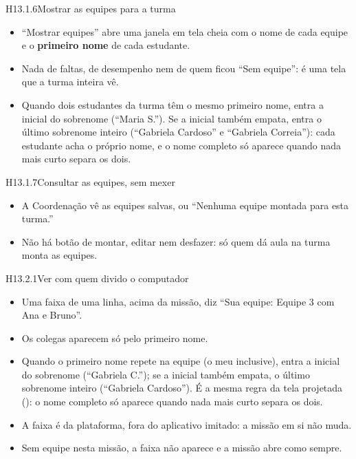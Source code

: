 \begin{historia}{H13.1.6}{Mostrar as equipes para a turma}{\pronto}
\aceite
\begin{itemize}
  \item \enquote{Mostrar equipes} abre uma janela em tela cheia com o nome de
    cada equipe e o \textbf{primeiro nome} de cada estudante.
  \item Nada de faltas, de desempenho nem de quem ficou \enquote{Sem equipe}:
    é uma tela que a turma inteira vê.
  \item Quando dois estudantes da turma têm o mesmo primeiro nome, entra a
    inicial do sobrenome (\enquote{Maria S.}). Se a inicial também empata,
    entra o último sobrenome inteiro (\enquote{Gabriela Cardoso} e
    \enquote{Gabriela Correia}): cada estudante acha o próprio nome, e o nome
    completo só aparece quando nada mais curto separa os dois.
\end{itemize}
\end{historia}

\begin{historia}{H13.1.7}{Consultar as equipes, sem mexer}{\pronto}
\aceite
\begin{itemize}
  \item A Coordenação vê as equipes salvas, ou \enquote{Nenhuma equipe montada
    para esta turma.}
  \item Não há botão de montar, editar nem desfazer: só quem dá aula na turma
    monta as equipes.
\end{itemize}
\end{historia}


\begin{historia}{H13.2.1}{Ver com quem divido o computador}{\pronto}
\aceite
\begin{itemize}
  \item Uma faixa de uma linha, acima da missão, diz \enquote{Sua equipe:
    Equipe 3 \textperiodcentered{} com Ana e Bruno}.
  \item Os colegas aparecem só pelo primeiro nome.
  \item Quando o primeiro nome repete na equipe (o meu inclusive), entra a
    inicial do sobrenome (\enquote{Gabriela C.}); se a inicial também empata,
    o último sobrenome inteiro (\enquote{Gabriela Cardoso}). É a mesma regra
    da tela projetada (): o nome completo só aparece quando nada
    mais curto separa os dois.
  \item A faixa é da plataforma, fora do aplicativo imitado: a missão em si não
    muda.
  \item Sem equipe nesta missão, a faixa não aparece e a missão abre como
    sempre.
\end{itemize}
\end{historia}

